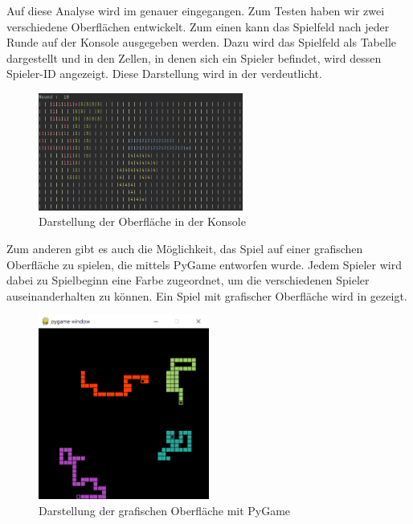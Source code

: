 Auf diese Analyse wird im  genauer eingegangen.
Zum Testen haben wir zwei verschiedene Oberflächen entwickelt.
Zum einen kann das Spielfeld nach jeder Runde auf der Konsole ausgegeben werden.
Dazu wird das Spielfeld als Tabelle dargestellt und in den Zellen, in denen sich ein Spieler befindet, wird dessen
Spieler-ID angezeigt.
Diese Darstellung wird in der  verdeutlicht.

\begin{figure}[htb]
\centering
\includegraphics[width=0.6\textwidth]{Bilder/KonsolenOberflaeche.png}
\caption{Darstellung der Oberfläche in der Konsole}
\label{fig:KonsolenOberflaeche}
\end{figure}

Zum anderen gibt es auch die Möglichkeit, das Spiel auf einer grafischen Oberfläche zu spielen, die mittels PyGame
 entworfen wurde.
Jedem Spieler wird dabei zu Spielbeginn eine Farbe zugeordnet, um die verschiedenen Spieler auseinanderhalten zu können.
Ein Spiel mit grafischer Oberfläche wird in  gezeigt.

\begin{figure}[htb]
\centering
\includegraphics[width=0.5\textwidth]{Bilder/GrafischeOberflaeche.png}
\caption{Darstellung der grafischen Oberfläche mit PyGame}
\label{fig:GrafischeOberflaeche}
\end{figure}
